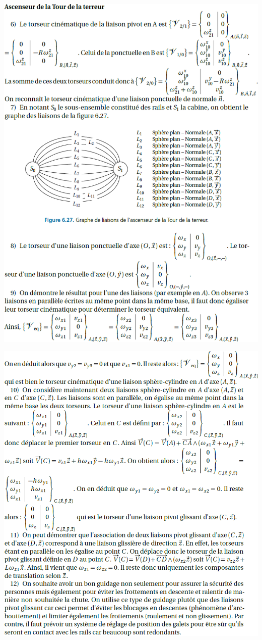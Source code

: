\documentclass[10pt,fleqn]{article} %
\begin{document}
\newpage 
\begin{center}
\includegraphics[width=.95\linewidth]{images/cor_01}
\end{center}

\begin{center}
\includegraphics[width=.95\linewidth]{images/cor_02}
\end{center}
\end{document}

